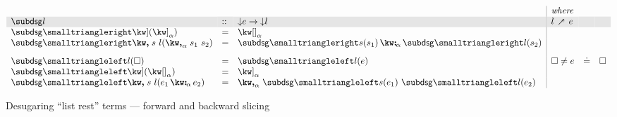 \begin{figure}[H]
\small
$\begin{array}{lll|llll}
   \arrayrulecolor{lightgray}
   &&&\textit{where}
   \\
   \rowcolor{verylightgray}
   \desugarGC{l} &::& \Below{e} \to \Below{l}
   & l \desugarFwd e
   &&
   \\
   \desugarFwdF{\exListEnd}(\annot{\exListEnd}{\alpha})
   &=&
   \annot{\exNil}{\alpha}
   \\
   \desugarFwdF{\exListNext{s}{l}}(\annListNext{s_1}{s_2}{\alpha})
   &=&
   \annCons{\desugarFwdF{s}(s_1)}{\desugarFwdF{l}(s_2)}{\alpha}
   \\[3mm]
   \desugarBwdF{l}(\hole)
   &=&
   \desugarBwdF{l}(e)
   &
   \hole \neq e &\eq& \hole
   \\
   \desugarBwdF{\exListEnd}(\annot{\exNil}{\alpha})
   &=&
   \annot{\exListEnd}{\alpha}
   \\
   \desugarBwdF{\exListNext{s}{l}}(\annCons{e_1}{e_2}{\alpha})
   &=&
   \annListNext{\desugarBwdF{s}(e_1)}{\desugarBwdF{l}(e_2)}{\alpha}
\end{array}$
\caption{Desugaring ``list rest'' terms --- forward and backward slicing}
\end{figure}
